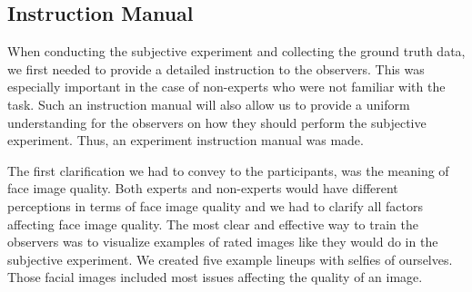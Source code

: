 \subsection{Instruction Manual}
\label{sec:intromanual}
When conducting the subjective experiment and collecting the ground truth data, we first needed to provide a detailed instruction to the observers. This was especially important in the case of non-experts who were not familiar with the task. Such an instruction manual will also allow us to provide a uniform understanding for the observers on how they should perform the subjective experiment. Thus, an experiment instruction manual was made. 

The first clarification we had to convey to the participants, was the meaning of face image quality. Both experts and non-experts would have different perceptions in terms of face image quality and we had to clarify all factors affecting face image quality. The most clear and effective way to train the observers was to visualize examples of rated images like they would do in the subjective experiment. We created five example lineups with selfies of ourselves. Those facial images included most issues affecting the quality of an image. 


